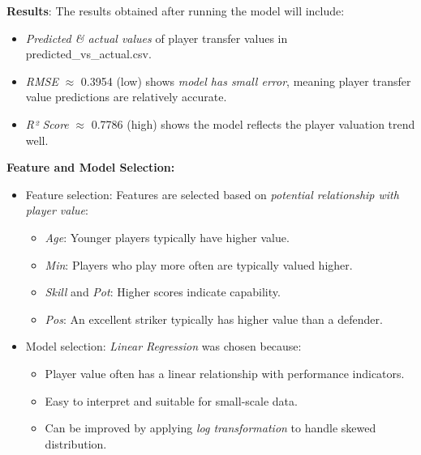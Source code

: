 \documentclass[12pt]{article}
\begin{document}
\textbf{Results}: The results obtained after running the model will include:

\begin{itemize}
    \item \textit{Predicted \& actual values} of player transfer values in predicted\_vs\_actual.csv.
    \item \textit{RMSE} $\approx$ 0.3954 (low) shows \textit{model has small error}, meaning player transfer value predictions are relatively accurate.
    \item \textit{R² Score} $\approx$ 0.7786 (high) shows the model reflects the player valuation trend well.
\end{itemize}

\textbf{Feature and Model Selection:}

\begin{itemize}
    \item Feature selection: Features are selected based on \textit{potential relationship with player value}:
    
    \begin{itemize}
        \item \textit{Age}: Younger players typically have higher value.
        \item \textit{Min}: Players who play more often are typically valued higher.
        \item \textit{Skill} and \textit{Pot}: Higher scores indicate capability.
        \item \textit{Pos}: An excellent striker typically has higher value than a defender.
    \end{itemize}
    
    \item Model selection: \textit{Linear Regression} was chosen because:
    
    \begin{itemize}
        \item Player value often has a linear relationship with performance indicators.
        \item Easy to interpret and suitable for small-scale data.
        \item Can be improved by applying \textit{log transformation} to handle skewed distribution.
    \end{itemize}
    
\end{itemize}
\end{document}
